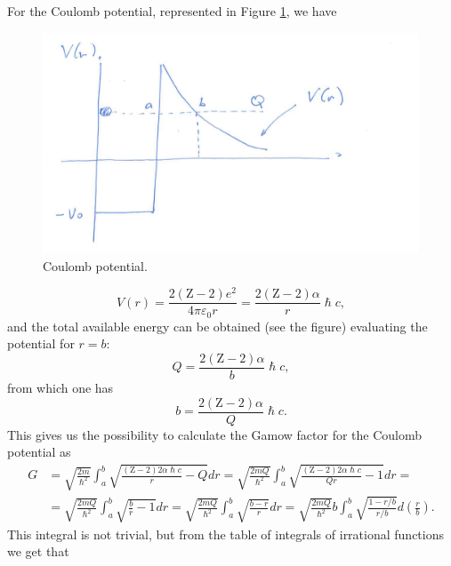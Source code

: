 For the Coulomb potential, represented in Figure \ref{nuclear-physics-fig:7}, we have
\begin{figure}[h]
    \centering
    \includegraphics[scale=0.3]{Figures/nuclear-physics-fig7}
    \caption{Coulomb potential.}
    \label{nuclear-physics-fig:7}
\end{figure}
\begin{equation*}
    V(r) = \frac{2(\mbox{Z}-2)e^2}{4\pi\varepsilon_0 r} = \frac{2(\mbox{Z}-2)\alpha}{r}\hslash c,
\end{equation*}
and the total available energy can be obtained (see the figure) evaluating the potential for $r=b$:
\begin{equation*}
    Q = \frac{2(\mbox{Z}-2)\alpha}{b}\hslash c,
\end{equation*}
from which one has
\begin{equation}
    b = \frac{2(\mbox{Z}-2)\alpha}{Q}\hslash c.
\end{equation}
This gives us the possibility to calculate the Gamow factor for the Coulomb potential as
\begin{equation*}
    \begin{split}
        G & = \sqrt{\frac{2m}{\hslash^2}}\int_a^b\sqrt{\frac{(\mbox{Z}-2)2\alpha\hslash c}{r}-Q} dr = \sqrt{\frac{2mQ}{\hslash^2}}\int_a^b\sqrt{\frac{(\mbox{Z}-2)2\alpha\hslash c}{Qr}-1} dr = \\
        & = \sqrt{\frac{2mQ}{\hslash^2}}\int_a^b\sqrt{\frac{b}{r}-1}dr = \sqrt{\frac{2mQ}{\hslash^2}}\int_a^b\sqrt{\frac{b-r}{r}}dr = \sqrt{\frac{2mQ}{\hslash^2}}b\int_a^b\sqrt{\frac{1-r/b}{r/b}}d\left(\frac{r}{b}\right).
    \end{split}
\end{equation*}
This integral is not trivial, but from the table of integrals of irrational functions we get that
